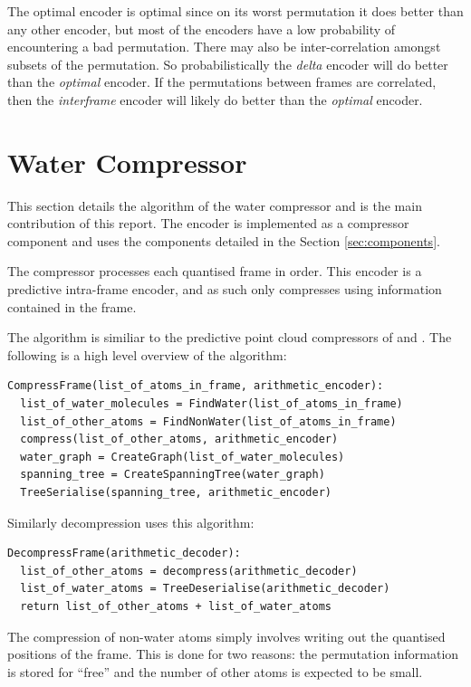 \documentclass[a4paper]{report}
\begin{document}
The optimal encoder is optimal since on its worst permutation it does better
than any other encoder, but most of the encoders have a low probability of
encountering a bad permutation. There may also be inter-correlation amongst
subsets of the permutation. So probabilistically the \emph{delta} encoder will
do better than the \emph{optimal} encoder. If the permutations between frames
are correlated, then the \emph{interframe} encoder will likely do better than
the \emph{optimal} encoder.


\section{Water Compressor}

This section details the algorithm of the water compressor and is the main
contribution of this report. The encoder is implemented as a compressor
component and uses the components detailed in the Section
\ref{sec:components}.

The compressor processes each quantised frame in order. This encoder is a
predictive intra-frame encoder, and as such only compresses using information
contained in the frame.

The algorithm is similiar to the predictive point cloud compressors of
\citet{gumholdcomp} and \citet{merrycomp}. The following is a high level
overview of the algorithm:

\begin{verbatim}
CompressFrame(list_of_atoms_in_frame, arithmetic_encoder):
  list_of_water_molecules = FindWater(list_of_atoms_in_frame)
  list_of_other_atoms = FindNonWater(list_of_atoms_in_frame)
  compress(list_of_other_atoms, arithmetic_encoder)
  water_graph = CreateGraph(list_of_water_molecules)
  spanning_tree = CreateSpanningTree(water_graph)
  TreeSerialise(spanning_tree, arithmetic_encoder)
\end{verbatim}

\noindent Similarly decompression uses this algorithm:

\begin{verbatim}
DecompressFrame(arithmetic_decoder):
  list_of_other_atoms = decompress(arithmetic_decoder)
  list_of_water_atoms = TreeDeserialise(arithmetic_decoder)
  return list_of_other_atoms + list_of_water_atoms
\end{verbatim}

The compression of non-water atoms simply involves writing out the quantised
positions of the frame. This is done for two reasons: the permutation
information is stored for ``free'' and the number of other atoms is expected
to be small.
\end{document}
